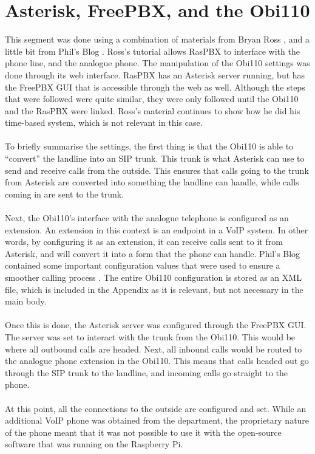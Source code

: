 \documentclass[main.tex]{subfiles}
\begin{document}
\section{Asterisk, FreePBX, and the Obi110}
This segment was done using a combination of materials from Bryan Ross \cite{bryanross}, and a little bit from Phil's Blog \cite{obihaiuk}. Ross's tutorial \cite{bryanross} allows RasPBX to interface with the phone line, and the analogue phone. The manipulation of the Obi110 settings was done through its web interface. RasPBX has an Asterisk server running, but has the FreePBX GUI that is accessible through the web as well. Although the steps that were followed were quite similar, they were only followed until the Obi110 and the RasPBX were linked. Ross's material continues to show how he did his time-based system, which is not relevant in this case.
\\\\
To briefly summarise the settings, the first thing is that the Obi110 is able to ``convert'' the landline into an SIP trunk. This trunk is what Asterisk can use to send and receive calls from the outside. This ensures that calls going to the trunk from Asterisk are converted into something the landline can handle, while calls coming in are sent to the trunk.
\\\\
Next, the Obi110's interface with the analogue telephone is configured as an extension. An extension in this context is an endpoint in a VoIP system. In other words, by configuring it as an extension, it can receive calls sent to it from Asterisk, and will convert it into a form that the phone can handle. Phil's Blog contained some important configuration values that were used to ensure a smoother calling process \cite{obihaiuk}. The entire Obi110 configuration is stored as an XML file, which is included in the Appendix  as it is relevant, but not necessary in the main body.
\\\\
Once this is done, the Asterisk server was configured through the FreePBX GUI. The server was set to interact with the trunk from the Obi110. This would be where all outbound calls are headed. Next, all inbound calls would be routed to the analogue phone extension in the Obi110. This means that calls headed out go through the SIP trunk to the landline, and incoming calls go straight to the phone.
\\\\
At this point, all the connections to the outside are configured and set. While an additional VoIP phone was obtained from the department, the proprietary nature of the phone meant that it was not possible to use it with the open-source software that was running on the Raspberry Pi.
\end{document}
